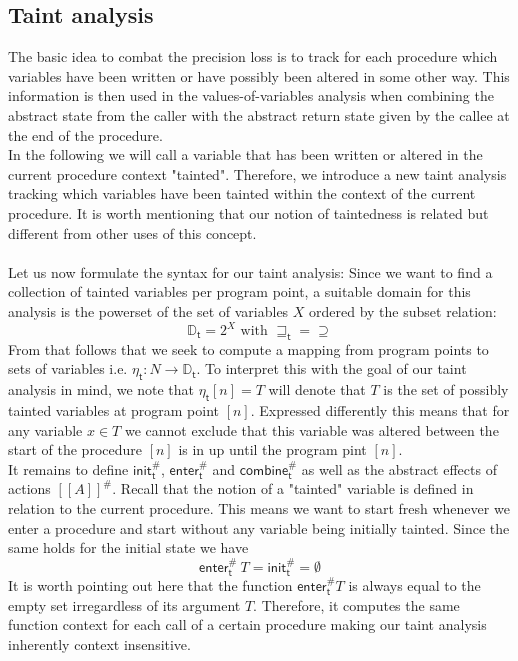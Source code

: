     \subsection{Taint analysis}\label{section:formalTaint}
      The basic idea to combat the precision loss is to track for each procedure which variables have been written or have possibly been altered in some other way. This information is then used in the values-of-variables analysis when combining the abstract state from the caller with the abstract return state given by the callee at the end of the procedure.\\
      In the following we will call a variable that has been written or altered in the current procedure context "tainted". Therefore, we introduce a new taint analysis tracking which variables have been tainted within the context of the current procedure. It is worth mentioning that our notion of taintedness is related but different from other uses of this concept.\\
      \\
      Let us now formulate the syntax for our taint analysis:
      Since we want to find a collection of tainted variables per program point, a suitable domain for this analysis is the powerset of the set of variables $X$ ordered by the subset relation:
      \[\mathbb{D}_\textsf{t} = 2^X \text{ with } \sqsupseteq_\textsf{t} = \supseteq\]
      From that follows that we seek to compute a mapping from program points to sets of variables i.e. $\eta_\textsf{t}: N \rightarrow \mathbb{D}_\textsf{t}$. To interpret this with the goal of our taint analysis in mind, we note that $\eta_\textsf{t} [n] = T$ will denote that $T$ is the set of possibly tainted variables at program point $[n]$. Expressed differently this means that for any variable $x \in T$ we cannot exclude that this variable was altered between the start of the procedure $[n]$ is in up until the program pint $[n]$.\\
      It remains to define $\textsf{init}^{\#}_\textsf{t}$, $\textsf{enter}^{\#}_\textsf{t}$ and $\textsf{combine}^{\#}_\textsf{t}$ as well as the abstract effects of actions $[\![  A ]\!]^{\#}$. Recall that the notion of a "tainted" variable is defined in relation to the current procedure. This means we want to start fresh whenever we enter a procedure and start without any variable being initially tainted. Since the same holds for the initial state we have 
      \[\textsf{enter}^{\#}_\textsf{t}\ T = \textsf{init}^{\#}_\textsf{t} = \emptyset\]
      It is worth pointing out here that the function $\textsf{enter}^{\#}_\textsf{t} T$ is always equal to the empty set irregardless of its argument $T$. Therefore, it computes the same function context for each call of a certain procedure making our taint analysis inherently context insensitive.\\

